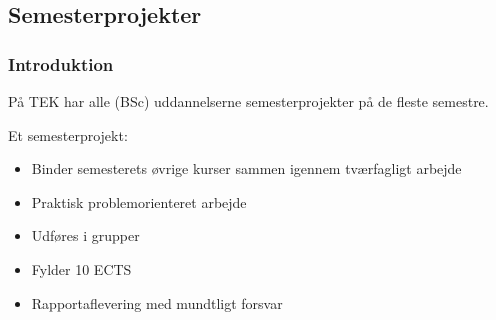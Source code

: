 {\begin{frame}[fragile]
{
  }
\end{frame}

\subsection{Semesterprojekter}
\begin{frame}[fragile]
  \frametitle{Introduktion }
  \vspace{5mm}
  På TEK har alle (BSc) uddannelserne semesterprojekter på de fleste semestre.
  
  \pause
  \vspace{7mm}
  Et semesterprojekt:
  \begin{itemize}
    \item Binder semesterets øvrige kurser sammen igennem tværfagligt arbejde
    \item Praktisk problemorienteret arbejde
    \item Udføres i grupper
    \item Fylder 10 ECTS
    \item Rapportaflevering med mundtligt forsvar
  \end{itemize}
\end{frame}

}


